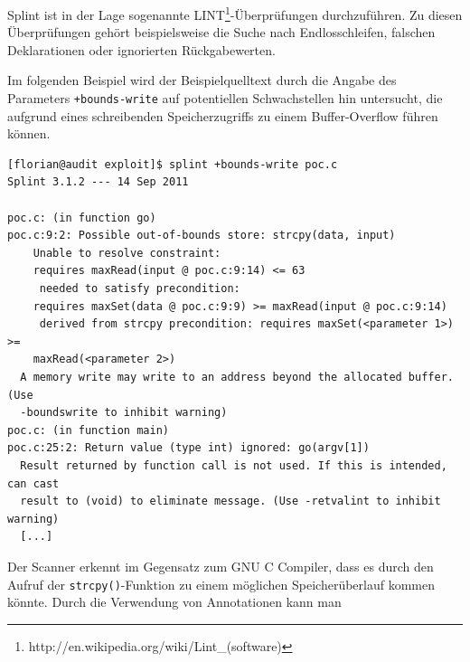 Splint ist in der Lage sogenannte LINT\footnote{http://en.wikipedia.org/wiki/Lint\_(software)}-Überprüfungen durchzuführen. Zu diesen Überprüfungen gehört beispielsweise die Suche nach Endlosschleifen, falschen Deklarationen oder ignorierten Rückgabewerten.

Im folgenden Beispiel wird der Beispielquelltext durch die Angabe des Parameters \texttt{+bounds-write} auf potentiellen Schwachstellen hin untersucht, die aufgrund eines schreibenden Speicherzugriffs zu einem Buffer-Overflow führen können.

\begin{lstlisting}[basicstyle=\ttfamily\footnotesize]
[florian@audit exploit]$ splint +bounds-write poc.c
Splint 3.1.2 --- 14 Sep 2011

poc.c: (in function go)
poc.c:9:2: Possible out-of-bounds store: strcpy(data, input)
    Unable to resolve constraint:
    requires maxRead(input @ poc.c:9:14) <= 63
     needed to satisfy precondition:
    requires maxSet(data @ poc.c:9:9) >= maxRead(input @ poc.c:9:14)
     derived from strcpy precondition: requires maxSet(<parameter 1>) >=
    maxRead(<parameter 2>)
  A memory write may write to an address beyond the allocated buffer. (Use
  -boundswrite to inhibit warning)
poc.c: (in function main)
poc.c:25:2: Return value (type int) ignored: go(argv[1])
  Result returned by function call is not used. If this is intended, can cast
  result to (void) to eliminate message. (Use -retvalint to inhibit warning)
  [...]
\end{lstlisting}

Der Scanner erkennt im Gegensatz zum GNU C Compiler, dass es durch den Aufruf der \texttt{strcpy()}-Funktion zu einem möglichen Speicherüberlauf kommen könnte. Durch die Verwendung von Annotationen kann man 